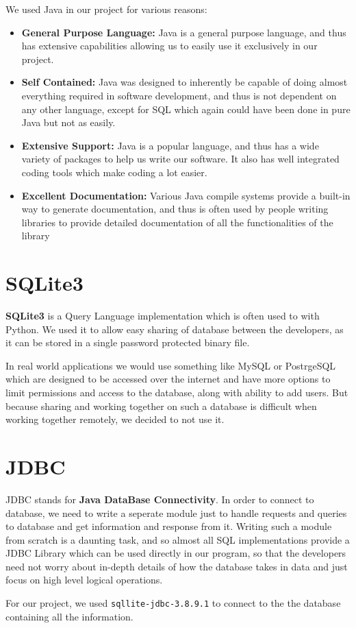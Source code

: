 \documentclass[12pt, a4paper]{article}
\begin{document}
We used Java in our project for various reasons:
\begin{itemize}

	\item \textbf{General Purpose Language:} Java is a general purpose language, and thus has extensive capabilities allowing us to easily use it exclusively in our project.
	\item \textbf{Self Contained:} Java was designed to inherently be capable of doing almost everything required in software development, and thus is not dependent on any other language, except for SQL which again could have been done in pure Java but not as easily.
	\item \textbf{Extensive Support:} Java is a popular language, and thus has a wide variety of packages to help us write our software. It also has well integrated coding tools which make coding a lot easier.
	\item \textbf{Excellent Documentation:} Various Java compile systems provide a built-in way to generate documentation, and thus is often used by people writing libraries to provide detailed documentation of all the functionalities of the library

\end{itemize}

\section{SQLite3}

\textbf{SQLite3} is a Query Language implementation which is often used to with Python. We used it to allow easy sharing of database between the developers, as it can be stored in a single password protected binary file.

In real world applications we would use something like MySQL or PostrgeSQL which are designed to be accessed over the internet and have more options to limit permissions and access to the database, along with ability to add users. But because sharing and working together on such a database is difficult when working together remotely, we decided to not use it.

\section{JDBC}

JDBC stands for \textbf{Java DataBase Connectivity}. In order to connect to database, we need to write a seperate module just to handle requests and queries to database and get information and response from it. Writing such a module from scratch is a daunting task, and so almost all SQL implementations provide a JDBC Library which can be used directly in our program, so that the developers need not worry about in-depth details of how the database takes in data and just focus on high level logical operations.

For our project, we used \lstinline{sqllite-jdbc-3.8.9.1} to connect to the the database containing all the information.
\end{document}

